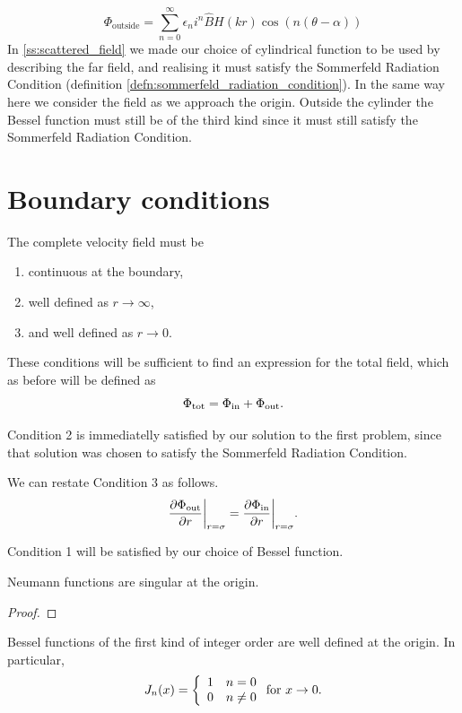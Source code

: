   \begin{equation}
    \Phi_{\text{outside}} = \sum^\infty_{n=0} \epsilon_n i^n \hat{B} H(kr) \cos(n(\theta-\alpha))
  \end{equation}
%
In \ref{ss:scattered_field} we made our choice of cylindrical function to be used by describing the far field, and realising it must satisfy the Sommerfeld Radiation Condition (definition \ref{defn:sommerfeld_radiation_condition}). In the same way here we consider the field as we approach the origin. Outside the cylinder the Bessel function must still be of the third kind since it must still satisfy the Sommerfeld Radiation Condition.
%
\section{Boundary conditions}
The complete velocity field must be
  \begin{enumerate}
    \item continuous at the boundary,
    \item well defined as $r \rightarrow \infty$,
    \item and well defined as $r \rightarrow 0$.
  \end{enumerate}\par
%
These conditions will be sufficient to find an expression for the total field, which as before will be defined as
  \begin{equation}
    \Phi_{\text{tot}} = \Phi_{\text{in}} + \Phi_{\text{out}}.
  \end{equation}\par
%
Condition 2 is immediatelly satisfied by our solution to the first problem, since that solution was chosen to satisfy the Sommerfeld Radiation Condition. \par
%
We can restate Condition 3 as follows.
  \begin{equation}\label{eq:in_boundary_conditon}
    \frac{\partial \Phi_{\text{out}}}{\partial r}\bigg\vert_{r=\sigma} =  \frac{\partial \Phi_{\text{in}}}{\partial r}\bigg\vert_{r=\sigma}.
  \end{equation}\par
%
Condition 1 will be satisfied by our choice of Bessel function.
  \begin{propn}
    Neumann functions are singular at the origin.
  \end{propn}
  \begin{proof}

  \end{proof}
  \begin{propn}
    Bessel functions of the first kind of integer order are well defined at the origin. In particular,
    \begin{align}\label{propn:bessel_arg_zero}
        J_n(x) =\left\{
          \begin{array}{c l}
               1 & n = 0 \\
               0 & n \neq 0
          \end{array}\right.
        \text{for } x \rightarrow 0.
    \end{align}
  \end{propn}
